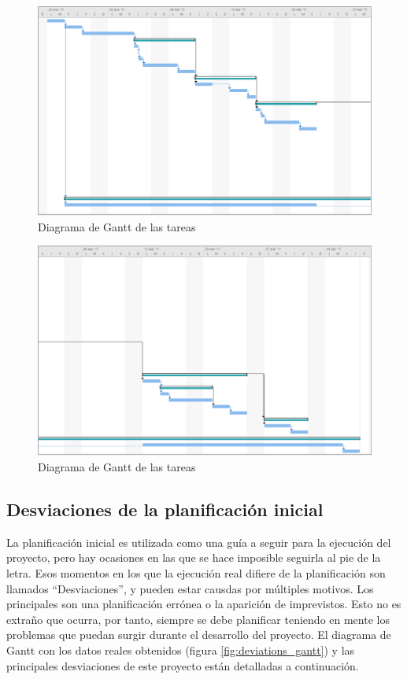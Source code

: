 \documentclass[12pt, twoside]{article}
\begin{document}
        \begin{figure}[h!]
            \centering
                \includegraphics[scale=0.5]{tasks_gantt0.eps}
                \caption{Diagrama de Gantt de las tareas}
                \label{fig:tasks_gantt0}
        \end{figure}

        \begin{figure}[h!]
            \centering
                \includegraphics[scale=0.5]{tasks_gantt1.eps}
                \caption{Diagrama de Gantt de las tareas}
                \label{fig:tasks_gantt1}
        \end{figure}

    \subsection{Desviaciones de la planificación inicial}
        La planificación inicial es utilizada como una guía a seguir para la ejecución del proyecto, pero hay ocasiones en las que se hace imposible seguirla al pie de la letra. Esos momentos en los que la ejecución real difiere de la planificación son llamados ``Desviaciones'', y pueden estar causdas por múltiples motivos. Los principales son una planificación errónea o la aparición de imprevistos. Esto no es extraño que ocurra, por tanto, siempre se debe planificar teniendo en mente los problemas que puedan surgir durante el desarrollo del proyecto. El diagrama de Gantt con los datos reales obtenidos (figura \ref{fig:deviations_gantt}) y las principales desviaciones de este proyecto están detalladas a continuación.
\end{document}
